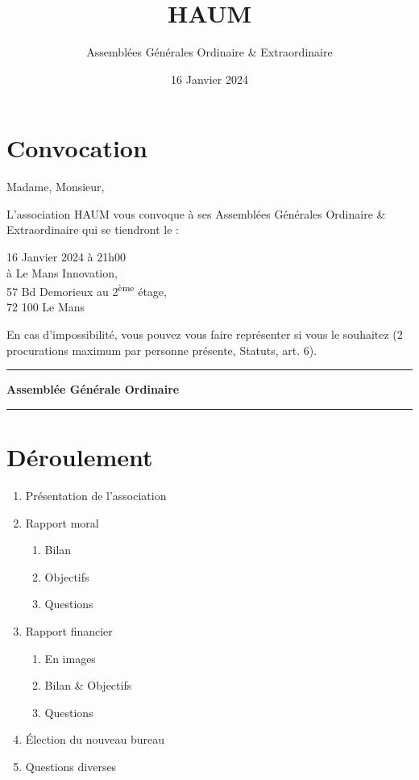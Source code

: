 \documentclass[11pt]{article}
\title{HAUM}
\author{Assemblées Générales Ordinaire \& Extraordinaire}
\date{16 Janvier 2024}
\begin{document}
\maketitle

\section*{Convocation}

Madame, Monsieur,

L'association HAUM vous convoque à ses Assemblées Générales Ordinaire \& Extraordinaire qui se tiendront le :

\begin{center}
{\Large 16 Janvier 2024 à 21h00}\\
à Le Mans Innovation, \\57 Bd Demorieux au 2\textsuperscript{ème} étage, \\72 100 Le Mans
\end{center}

En cas d'impossibilité, vous pouvez vous faire représenter si vous le souhaitez (2 procurations maximum par personne présente, Statuts, art. 6).

\newpage

\hrule
\vspace{.6cm}
\begin{center}
\Large\bfseries Assemblée Générale Ordinaire
\end{center}
\vspace{.3cm}
\hrule

\vspace{1.5cm}

\section*{Déroulement}

\begin{enumerate}
    \item Présentation de l'association
    \item Rapport moral
        \begin{enumerate}
            \item Bilan
            \item Objectifs
            \item Questions
        \end{enumerate}
    \item Rapport financier
        \begin{enumerate}
						\item En images
            \item Bilan \& Objectifs
            \item Questions
        \end{enumerate}
    \item Élection du nouveau bureau
    \item Questions diverses
\end{enumerate}
\end{document}
